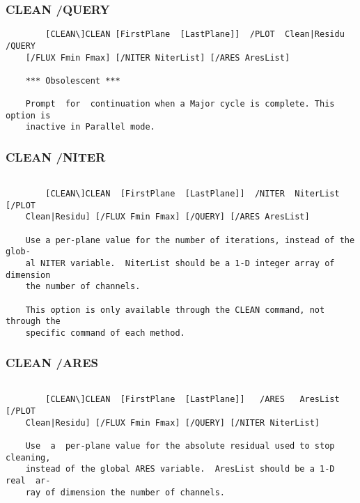 \subsubsection{CLEAN /QUERY}
\begin{verbatim}
        [CLEAN\]CLEAN [FirstPlane  [LastPlane]]  /PLOT  Clean|Residu  /QUERY
    [/FLUX Fmin Fmax] [/NITER NiterList] [/ARES AresList]

    *** Obsolescent ***

    Prompt  for  continuation when a Major cycle is complete. This option is
    inactive in Parallel mode.

\end{verbatim}
\subsubsection{CLEAN /NITER}
\begin{verbatim}

        [CLEAN\]CLEAN  [FirstPlane  [LastPlane]]  /NITER  NiterList   [/PLOT
    Clean|Residu] [/FLUX Fmin Fmax] [/QUERY] [/ARES AresList]

    Use a per-plane value for the number of iterations, instead of the glob-
    al NITER variable.  NiterList should be a 1-D integer array of dimension
    the number of channels.

    This option is only available through the CLEAN command, not through the
    specific command of each method.

\end{verbatim}
\subsubsection{CLEAN /ARES}
\begin{verbatim}

        [CLEAN\]CLEAN  [FirstPlane  [LastPlane]]   /ARES   AresList   [/PLOT
    Clean|Residu] [/FLUX Fmin Fmax] [/QUERY] [/NITER NiterList]

    Use  a  per-plane value for the absolute residual used to stop cleaning,
    instead of the global ARES variable.  AresList should be a 1-D real  ar-
    ray of dimension the number of channels.



\end{verbatim}
